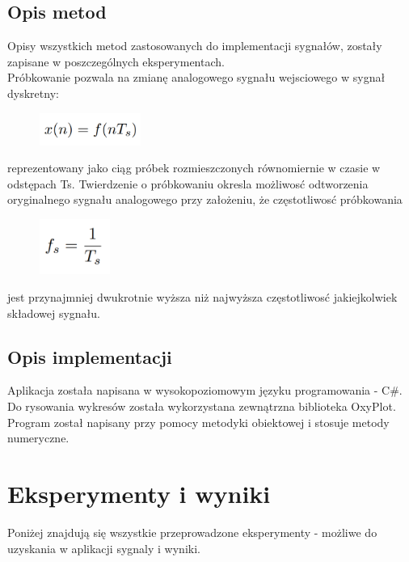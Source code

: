 \documentclass[12pt]{article}
\begin{document}
\subsection{Opis metod}
Opisy wszystkich metod zastosowanych do implementacji sygnałów, zostały zapisane w poszczególnych eksperymentach. 
\\ Próbkowanie pozwala na zmianę analogowego sygnału wejsciowego w sygnał dyskretny:
\begin{figure}[h!]
 \centering
 \includegraphics[width=3.3cm]{WzorProbkowanie.PNG}
 \vspace{-0.3cm}
 \label{Wykres}
\end{figure}
reprezentowany jako ciąg próbek rozmieszczonych równomiernie w czasie w odstępach Ts. Twierdzenie o próbkowaniu okresla możliwosć odtworzenia oryginalnego sygnału analogowego przy założeniu, że częstotliwosć próbkowania
\begin{figure}[h!]
 \centering
 \includegraphics[width=2.3cm]{cz.PNG}
 \vspace{-0.3cm}
 \label{cz}
\end{figure}
jest przynajmniej dwukrotnie wyższa niż najwyższa częstotliwosć  jakiejkolwiek składowej sygnału.
\subsection{Opis implementacji}
Aplikacja została napisana w wysokopoziomowym języku programowania - C\#. Do rysowania wykresów została wykorzystana zewnątrzna biblioteka OxyPlot. Program został napisany przy pomocy metodyki obiektowej i stosuje metody numeryczne.

\section{Eksperymenty i wyniki}

Poniżej znajdują się wszystkie przeprowadzone eksperymenty - możliwe do uzyskania w aplikacji sygnaly i wyniki. 

\end{document}
